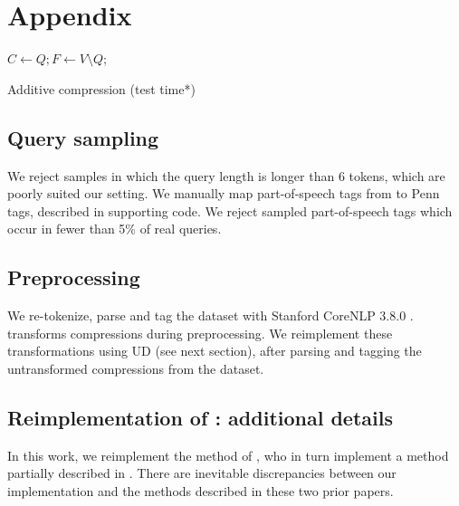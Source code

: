 \appendix


\section{Appendix}

\begin{algorithm}[]
\SetAlgoLined
{}
 $ C \gets Q;  F \gets V \setminus Q$; \\
 \caption{Additive compression {\small(test time*)}}
\end{algorithm}\label{a:algo}

\subsection{Query sampling}
We reject samples in which the query length is longer than 6 tokens, which are poorly suited our setting. We manually map part-of-speech tags from \citet{Barr2008TheLS} to Penn tags, described in supporting code. We reject sampled part-of-speech tags which occur in fewer than 5\% of real queries.

\subsection{Preprocessing}
We re-tokenize, parse and tag the \citet{filippova2013overcoming} dataset with Stanford CoreNLP 3.8.0 \cite{corenlp}. \citet{filippova2013overcoming} transforms compressions during preprocessing. We reimplement these transformations using UD (see next section), after parsing and tagging the untransformed compressions from the dataset.

\subsection{Reimplementation of \citet{filippova2013overcoming}: additional details}

In this work, we reimplement the method of \citet{filippova2013overcoming}, who in turn implement a method partially described in \citet{filippova2008dependency}.  There are inevitable discrepancies between our implementation and the methods described in these two prior papers.  

